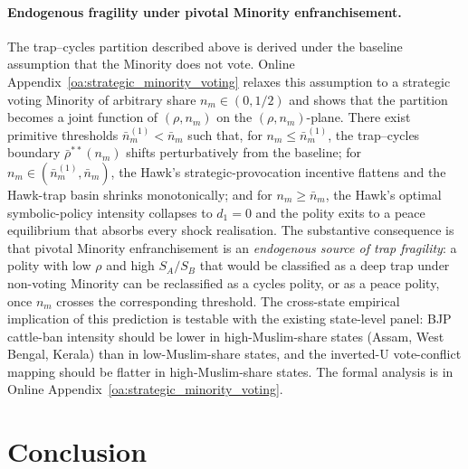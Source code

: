 \documentclass[11pt,twoside]{extarticle}
\begin{document}
\paragraph{Endogenous fragility under pivotal Minority enfranchisement.} The trap--cycles partition described above is derived under the baseline assumption that the Minority does not vote. Online Appendix~\ref{oa:strategic_minority_voting} relaxes this assumption to a strategic voting Minority of arbitrary share $n_m\in(0,1/2)$ and shows that the partition becomes a joint function of $(\rho,n_m)$ on the $(\rho,n_m)$-plane. There exist primitive thresholds $\bar n_m^{(1)}<\bar n_m$ such that, for $n_m\le\bar n_m^{(1)}$, the trap--cycles boundary $\bar\rho^{**}(n_m)$ shifts perturbatively from the baseline; for $n_m\in(\bar n_m^{(1)},\bar n_m)$, the Hawk's strategic-provocation incentive flattens and the Hawk-trap basin shrinks monotonically; and for $n_m\ge\bar n_m$, the Hawk's optimal symbolic-policy intensity collapses to $d_1=0$ and the polity exits to a peace equilibrium that absorbs every shock realisation. The substantive consequence is that pivotal Minority enfranchisement is an \emph{endogenous source of trap fragility}: a polity with low $\rho$ and high $S_A/S_B$ that would be classified as a deep trap under non-voting Minority can be reclassified as a cycles polity, or as a peace polity, once $n_m$ crosses the corresponding threshold. The cross-state empirical implication of this prediction is testable with the existing state-level panel: BJP cattle-ban intensity should be lower in high-Muslim-share states (Assam, West Bengal, Kerala) than in low-Muslim-share states, and the inverted-U vote-conflict mapping should be flatter in high-Muslim-share states. The formal analysis is in Online Appendix~\ref{oa:strategic_minority_voting}.

\section{Conclusion}\label{sec:conclusion_v3}
\end{document}
